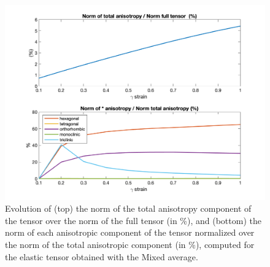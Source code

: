 \begin{figure}[ht]
    \centering
    \includegraphics[width=1.0\textwidth]{DREX_S/dec.png}
    \caption{Evolution of (top) the norm of the total anisotropy component of the tensor over the norm of the full tensor (in \%), and (bottom) the norm of each anisotropic component of the tensor normalized over the norm of the total anisotropic component (in \%), computed for the elastic tensor obtained with the Mixed average.}
    \label{fig:dec}
\end{figure}

\vfill %